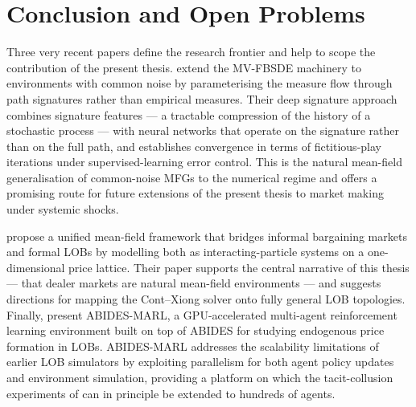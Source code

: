 \section{Conclusion and Open Problems}\label{sec:lit-conclusion}

Three very recent papers define the research frontier and help to
scope the contribution of the present thesis.
\citet{hu2025} extend the MV-FBSDE machinery to
environments with common noise by parameterising the measure flow
through path signatures rather than empirical measures.  Their deep
signature approach combines signature features — a tractable
compression of the history of a stochastic process — with neural
networks that operate on the signature rather than on the full path,
and establishes convergence in terms of fictitious-play iterations
under supervised-learning error control.  This is the natural
mean-field generalisation of common-noise MFGs
\citep{carmona2016, carmona2018} to the
numerical regime and offers a promising route for future extensions
of the present thesis to market making under systemic shocks.

\citet{navarro2025} propose a unified mean-field
framework that bridges informal bargaining markets and formal LOBs by
modelling both as interacting-particle systems on a one-dimensional
price lattice.  Their paper supports the central narrative of this
thesis — that dealer markets are natural mean-field environments —
and suggests directions for mapping the Cont--Xiong solver onto
fully general LOB topologies.  Finally, \citet{cheridito2025}
present ABIDES-MARL, a GPU-accelerated multi-agent reinforcement
learning environment built on top of ABIDES for studying endogenous
price formation in LOBs.  ABIDES-MARL addresses the scalability
limitations of earlier LOB simulators by exploiting parallelism for
both agent policy updates and environment simulation, providing a
platform on which the tacit-collusion experiments of
\citet{cont2024} can in principle be extended to hundreds
of agents.


